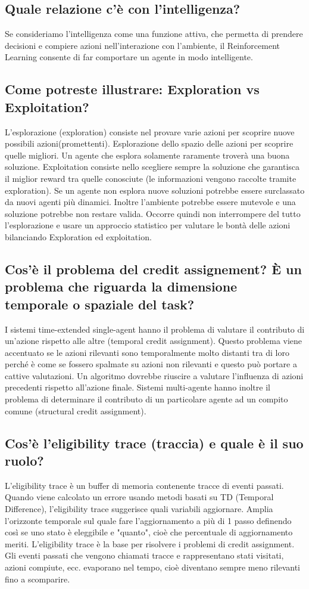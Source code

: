 \documentclass[\main/main.tex]{subfiles}
\begin{document}
\subsection{Quale relazione c'è con l'intelligenza?}
Se consideriamo l’intelligenza come una funzione attiva, che permetta di prendere decisioni e compiere azioni nell’interazione con l’ambiente, il Reinforcement Learning consente di far comportare un agente in modo intelligente.

\subsection{Come potreste illustrare: Exploration vs Exploitation?}
L'esplorazione (exploration) consiste nel provare varie azioni per scoprire nuove possibili azioni(promettenti). Esplorazione dello spazio delle azioni per scoprire quelle migliori.
Un agente che esplora solamente raramente troverà una buona soluzione.
Exploitation consiste nello scegliere sempre la soluzione che garantisca il miglior reward tra quelle conosciute (le informazioni vengono raccolte tramite exploration).
Se un agente non esplora nuove soluzioni potrebbe essere surclassato da nuovi agenti più dinamici. Inoltre l'ambiente potrebbe essere mutevole e una soluzione potrebbe non restare valida. Occorre quindi non interrompere del tutto l'esplorazione e usare un approccio statistico per valutare le bontà delle azioni bilanciando Exploration ed exploitation.


\subsection{Cos'è il problema del credit assignement? È un problema che riguarda la dimensione temporale o spaziale del task?}
I sistemi time-extended single-agent hanno il problema di valutare il contributo di un'azione rispetto alle altre (temporal credit assignment).
Questo problema viene accentuato se le azioni rilevanti sono temporalmente molto distanti tra di loro perché è come se fossero spalmate su azioni non rilevanti e questo può portare a cattive valutazioni. Un algoritmo dovrebbe riuscire a valutare l'influenza di azioni precedenti rispetto all'azione finale.
Sistemi multi-agente hanno inoltre il problema di determinare il contributo di un particolare agente ad un compito comune (structural credit assignment).

\subsection{Cos'è l'eligibility trace (traccia) e quale è il suo ruolo?}
L'eligibility trace è un buffer di memoria contenente tracce di eventi passati.
Quando viene calcolato un errore usando metodi basati su TD (Temporal Difference), l'eligibility trace suggerisce quali variabili aggiornare.
Amplia l’orizzonte temporale sul quale fare l’aggiornamento a più di 1 passo definendo così se uno stato è eleggibile e "quanto", cioè che percentuale di aggiornamento meriti.
L'eligibility trace è la base per risolvere i problemi di credit assignment.
Gli eventi passati che vengono chiamati tracce e rappresentano stati visitati, azioni compiute, ecc. evaporano nel tempo, cioè diventano sempre meno rilevanti fino a scomparire.
\end{document}
